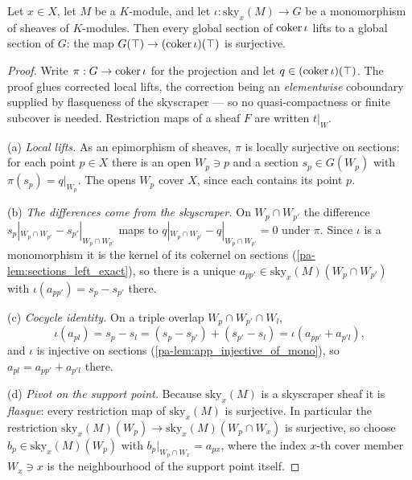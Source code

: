 \begin{theorem}
  \label{pa-thm:sky_cokernel_app_top_surjective}
  \leanok

  Let \(x \in X\), let \(M\) be a \(K\)-module, and let \(\iota : \mathrm{sky}_x(M) \to G\) be a
  monomorphism of sheaves of \(K\)-modules. Then every global section of \(\operatorname{coker} \iota\) lifts
  to a global section of \(G\): the map \(G(\top) \to (\operatorname{coker} \iota)(\top)\) is surjective.
\end{theorem}
\begin{proof}
  \leanok
  Write \(\pi : G \to \operatorname{coker} \iota\) for the projection and let \(q \in (\operatorname{coker} \iota)(\top)\).
  The proof glues corrected local lifts, the correction being an \emph{elementwise} coboundary
  supplied by flasqueness of the skyscraper --- so no quasi-compactness or finite subcover is
  needed. Restriction maps of a sheaf \(F\) are written \(t|_W\).

  (a) \emph{Local lifts.} As an epimorphism of sheaves, \(\pi\) is locally surjective on
  sections: for each point \(p \in X\) there is an open \(W_p \ni p\) and a section
  \(s_p \in G(W_p)\) with \(\pi(s_p) = q|_{W_p}\). The opens \(W_p\) cover \(X\), since each
  contains its point \(p\).

  (b) \emph{The differences come from the skyscraper.} On \(W_p \cap W_{p'}\) the difference
  \(s_p|_{W_p \cap W_{p'}} - s_{p'}|_{W_p \cap W_{p'}}\) maps to
  \(q|_{W_p \cap W_{p'}} - q|_{W_p \cap W_{p'}} = 0\) under \(\pi\). Since \(\iota\) is a
  monomorphism it is the kernel of its cokernel on sections (\ref{pa-lem:sections_left_exact}), so
  there is a unique \(a_{pp'} \in \mathrm{sky}_x(M)(W_p \cap W_{p'})\) with
  \(\iota(a_{pp'}) = s_p - s_{p'}\) there.

  (c) \emph{Cocycle identity.} On a triple overlap \(W_p \cap W_{p'} \cap W_l\),
  \[
    \iota(a_{pl}) = s_p - s_l = (s_p - s_{p'}) + (s_{p'} - s_l) = \iota(a_{pp'} + a_{p'l}) ,
  \]
  and \(\iota\) is injective on sections (\ref{pa-lem:app_injective_of_mono}), so
  \(a_{pl} = a_{pp'} + a_{p'l}\) there.

  (d) \emph{Pivot on the support point.} Because \(\mathrm{sky}_x(M)\) is a skyscraper sheaf it
  is \emph{flasque}: every restriction map of \(\mathrm{sky}_x(M)\) is surjective. In particular
  the restriction \(\mathrm{sky}_x(M)(W_p) \to \mathrm{sky}_x(M)(W_p \cap W_x)\) is surjective,
  so choose \(b_p \in \mathrm{sky}_x(M)(W_p)\) with \(b_p|_{W_p \cap W_x} = a_{px}\), where the
  index \(x\)-th cover member \(W_x \ni x\) is the neighbourhood of the support point itself.


\end{proof}
